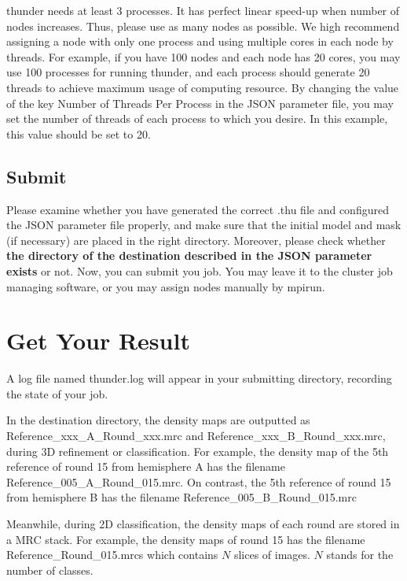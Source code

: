 \documentclass{article}
\begin{document}
            \textsf{thunder} needs at least 3 processes. It has perfect linear speed-up when number of nodes increases. Thus, please use as many nodes as possible. We high recommend assigning a node with only one process and using multiple cores in each node by threads. For example, if you have 100 nodes and each node has 20 cores, you may use 100 processes for running \textsf{thunder}, and each process should generate 20 threads to achieve maximum usage of computing resource. By changing the value of the key \textsf{Number of Threads Per Process} in the JSON parameter file, you may set the number of threads of each process to which you desire. In this example, this value should be set to 20.
            
        \subsection{Submit}
        
        Please examine whether you have generated the correct \textsf{.thu} file and configured the JSON parameter file properly, and make sure that the initial model and mask (if necessary) are placed in the right directory. Moreover, please check whether \textbf{the directory of the destination described in the JSON parameter exists} or not. Now, you can submit you job. You may leave it to the cluster job managing software, or you may assign nodes manually by \textsf{mpirun}.
    
    \section{Get Your Result}
    
        A log file named \textsf{thunder.log} will appear in your submitting directory, recording the state of your job.
        
        In the destination directory, the density maps are outputted as \textsf{Reference\_xxx\_A\_Round\_xxx.mrc} and \textsf{Reference\_xxx\_B\_Round\_xxx.mrc}, during 3D refinement or classification. For example, the density map of the 5th reference of round 15 from hemisphere A has the filename \textsf{Reference\_005\_A\_Round\_015.mrc}. On contrast, the 5th reference of round 15 from hemisphere B has the filename \textsf{Reference\_005\_B\_Round\_015.mrc}
        
        Meanwhile, during 2D classification, the density maps of each round are stored in a MRC stack. For example, the density maps of round 15 has the filename \textsf{Reference\_Round\_015.mrcs} which contains $N$ slices of images. $N$ stands for the number of classes.
\end{document}
